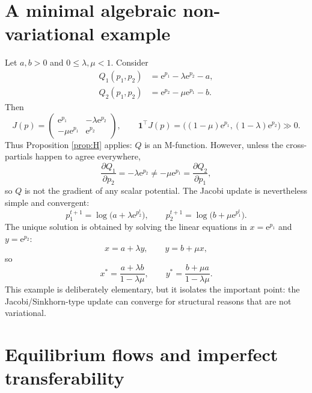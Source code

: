 \documentclass[11pt]{article}
\newcommand{\one}{\mathbf{1}}
\newcommand{\e}{\mathrm{e}}
\theoremstyle{definition}
\theoremstyle{plain}
\begin{document}
\section{A minimal algebraic non-variational example}

Let $a,b>0$ and $0\leq\lambda,\mu<1$. Consider
\begin{align*}
        Q_1(p_1,p_2)&=\e^{p_1}-\lambda\e^{p_2}-a,\\
        Q_2(p_1,p_2)&=\e^{p_2}-\mu\e^{p_1}-b.
\end{align*}
Then
\[
        J(p)=
        \begin{pmatrix}
        \e^{p_1} & -\lambda\e^{p_2}\\
        -\mu\e^{p_1} & \e^{p_2}
        \end{pmatrix},
        \qquad
        \one^\top J(p)=\bigl((1-\mu)\e^{p_1},(1-\lambda)\e^{p_2}\bigr)\gg0.
\]
Thus Proposition \ref{prop:H} applies: $Q$ is an M-function. However, unless the cross-partials happen to agree everywhere,
\[
        \frac{\partial Q_1}{\partial p_2}=-\lambda\e^{p_2}
        \neq
        -\mu\e^{p_1}=\frac{\partial Q_2}{\partial p_1},
\]
so $Q$ is not the gradient of any scalar potential. The Jacobi update is nevertheless simple and convergent:
\[
        p_1^{t+1}=\log\bigl(a+\lambda\e^{p_2^t}\bigr),
        \qquad
        p_2^{t+1}=\log\bigl(b+\mu\e^{p_1^t}\bigr).
\]
The unique solution is obtained by solving the linear equations in $x=\e^{p_1}$ and $y=\e^{p_2}$:
\[
        x=a+\lambda y,
        \qquad y=b+\mu x,
\]
so
\[
        x^*=\frac{a+\lambda b}{1-\lambda\mu},
        \qquad
        y^*=\frac{b+\mu a}{1-\lambda\mu}.
\]
This example is deliberately elementary, but it isolates the important point: the Jacobi/Sinkhorn-type update can converge for structural reasons that are not variational.

\section{Equilibrium flows and imperfect transferability}
\end{document}
